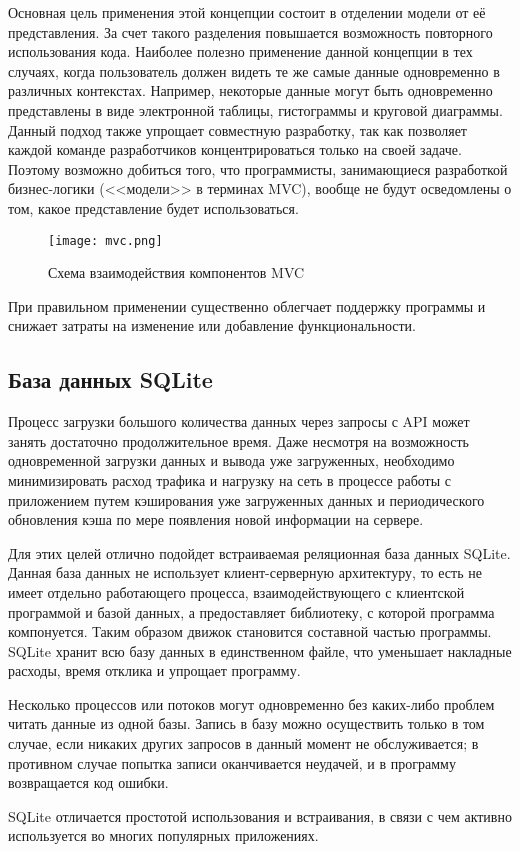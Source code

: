 Основная цель применения этой концепции состоит в отделении модели от её
представления. За счет такого разделения повышается возможность повторного
использования кода. Наиболее полезно применение данной концепции в тех случаях,
когда пользователь должен видеть те же самые данные одновременно в различных
контекстах. Например, некоторые данные могут быть одновременно представлены в
виде электронной таблицы, гистограммы и круговой диаграммы.
Данный подход также упрощает совместную разработку, так как позволяет каждой
команде разработчиков концентрироваться только на своей задаче.
Поэтому возможно добиться того, что программисты, занимающиеся разработкой
бизнес-логики (<<модели>> в терминах MVC), вообще не будут осведомлены о том,
какое представление будет использоваться.

\begin{figure}[h!]
\centering
\texttt{[image: mvc.png]}
\caption{Схема взаимодействия компонентов MVC}
\label{fig:mvc}
\end{figure}

При правильном применении \mvc{} существенно облегчает поддержку программы и
снижает затраты на изменение или добавление функциональности.

\subsection{База данных SQLite}
\label{sec:sqlite}
Процесс загрузки большого количества данных через запросы с API может занять
достаточно продолжительное время. Даже несмотря на возможность одновременной
загрузки данных и вывода уже загруженных, необходимо минимизировать расход
трафика и нагрузку на сеть в процессе работы с приложением путем кэширования
уже загруженных данных и периодического обновления кэша по мере появления новой
информации на сервере.

Для этих целей отлично подойдет встраиваемая реляционная база данных SQLite.
Данная база данных не использует клиент-серверную архитектуру, то есть не имеет
отдельно работающего процесса, взаимодействующего с клиентской программой и
базой данных, а предоставляет библиотеку, с которой программа компонуется. Таким
образом движок становится составной частью программы. SQLite хранит всю базу
данных в единственном файле, что уменьшает накладные расходы, время отклика и упрощает
программу.

Несколько процессов или потоков могут одновременно без каких-либо проблем читать
данные из одной базы. Запись в базу можно осуществить только в том случае, если
никаких других запросов в данный момент не обслуживается; в противном случае
попытка записи оканчивается неудачей, и в программу возвращается код ошибки.

SQLite отличается простотой использования и встраивания, в связи с чем активно
используется во многих популярных приложениях.




